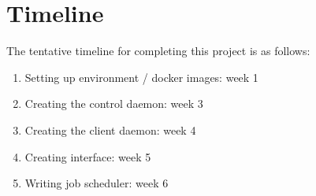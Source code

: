 \documentclass[letterpaper, 11pt]{article}
\begin{document}
\section{Timeline}
The tentative timeline for completing this project is as follows:

\begin{enumerate}
  \item Setting up environment / docker images: week 1
  \item Creating the control daemon: week 3
  \item Creating the client daemon: week 4
  \item Creating interface: week 5
  \item Writing job scheduler: week 6
\end{enumerate}

{\small
  \printbibliography
}
\end{document}
